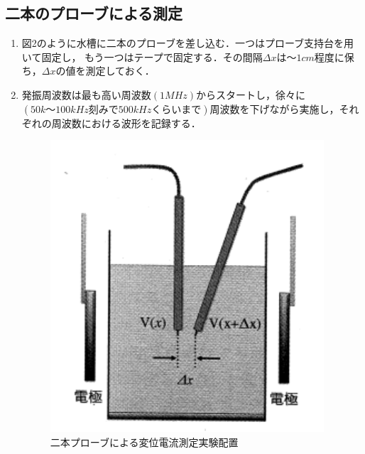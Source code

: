 \subsection{二本のプローブによる測定}
\begin{enumerate}
    \item 図2のように水槽に二本のプローブを差し込む．一つはプローブ支持台を用いて固定し，
    もう一つはテープで固定する．その間隔$\Delta x$は～$1\si{cm}$程度に保ち，$\Delta x$の値を測定しておく．
    \item 発振周波数は最も高い周波数$(1\si{MHz})$からスタートし，徐々に$(50\si{k}～100\si{kHz} 刻みで
    500\si{kHz}くらいまで)$周波数を下げながら実施し，それぞれの周波数における波形を記録する．
    \begin{figure}[H]
        \centering
        \includegraphics[scale=0.75]{figure2.pdf}
        \caption{二本プローブによる変位電流測定実験配置}
    \end{figure}
    
\end{enumerate}

